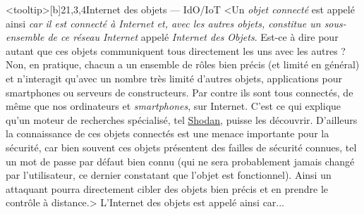 \begin{quiz}[title={Informatique embarquée et objets connectés}]
\begin{quizquestion*}<tooltip>[b]{2}{1,3,4}{Internet des objets --- IdO/IoT}
<Un \emph{objet connecté} est appelé ainsi \emph{car il est connecté à Internet et, avec les autres objets, constitue un sous-ensemble de ce réseau Internet} appelé \emph{Internet des Objets}.
Est-ce à dire pour autant que ces objets communiquent tous directement les uns avec les autres ? Non, en pratique, chacun a un ensemble de rôles bien précis (et limité en général) et n’interagit qu’avec un nombre très limité d’autres objets, applications pour smartphones ou serveurs de constructeurs.
Par contre ils sont tous connectés, de même que nos ordinateurs et \textit{smartphones}, sur Internet. C’est ce qui explique qu’un moteur de recherches spécialisé, tel \href{https://www.shodan.io/}{Shodan}, puisse les découvrir.
D’ailleurs la connaissance de ces objets connectés est une menace importante pour la sécurité, car bien souvent ces objets présentent des failles de sécurité connues, tel un mot de passe par défaut bien connu (qui ne sera probablement jamais changé par l’utilisateur, ce dernier constatant que l’objet est fonctionnel). Ainsi un attaquant pourra directement cibler des objets bien précis et en prendre le contrôle à distance.>
L’Internet des objets est appelé ainsi car... 
\end{quizquestion*}


\end{quiz}
